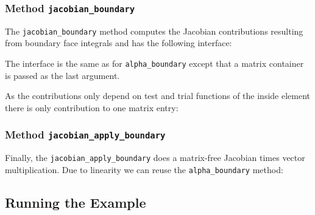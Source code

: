 \documentclass[a4paper,12pt]{article}
\begin{document}
\subsubsection*{Method \lstinline{jacobian_boundary}}

The \lstinline{jacobian_boundary} method computes 
the Jacobian contributions resulting from boundary face integrals
and has the following interface:

The interface is the same as for \lstinline{alpha_boundary} except that
a matrix container is passed as the last argument.

As the contributions only depend on test and trial functions 
of the inside element there is only contribution to one
matrix entry:


\subsubsection*{Method \lstinline{jacobian_apply_boundary}}

Finally, the \lstinline{jacobian_apply_boundary} does a 
matrix-free Jacobian times vector multiplication. Due to linearity
we can reuse the \lstinline{alpha_boundary} method:


\subsection{Running the Example}
\end{document}
